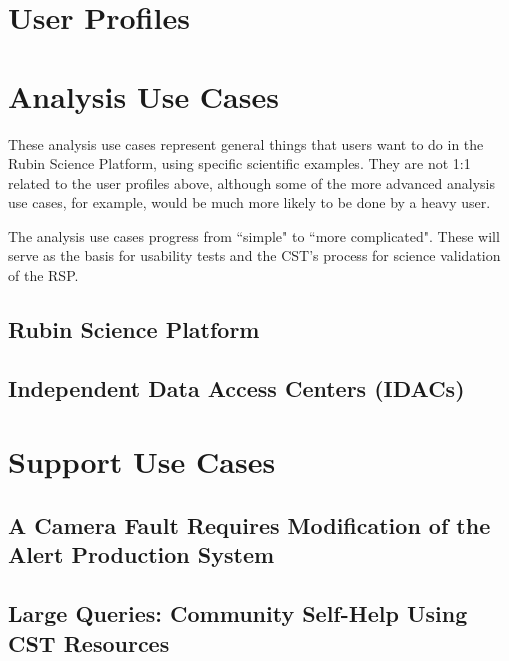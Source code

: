 \documentclass[DM,lsstdraft,authoryear,toc]{lsstdoc}
\begin{document}
\clearpage
\section{User Profiles}




\clearpage
\section{Analysis Use Cases}

These analysis use cases represent general things that users want to do in the Rubin Science Platform,
using specific scientific examples.
They are not 1:1 related to the user profiles above, although some of the more advanced analysis
use cases, for example, would be much more likely to be done by a heavy user.

The analysis use cases progress from ``simple" to ``more complicated".
These will serve as the basis for usability tests and the CST's process for science validation of
the RSP.

\subsection{Rubin Science Platform}



\subsection{Independent Data Access Centers (IDACs)}




\clearpage
\section{Support Use Cases}

\clearpage


\clearpage


\clearpage


\clearpage
\subsection{A Camera Fault Requires Modification of the Alert Production System}


\clearpage
\subsection{Large Queries: Community Self-Help Using CST Resources}

\end{document}
